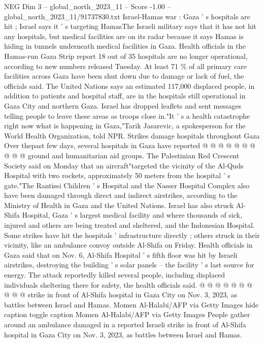 \begin{textsample}{NEG Dim 3 – global\_north\_2023\_11 – Score -1.00 – global\_north\_2023\_11/91737830.txt}  \label{ex:f3_neg_283}
Israel-Hamas war : Gaza ' s hospitals are hit ; Israel says it ' s targeting HamasThe Israeli military says that it has not hit any hospitals, but medical facilities are on its radar because it says Hamas is hiding in tunnels underneath medical facilities in Gaza.
Health officials in the Hamas-run Gaza Strip report 18 out of 35 hospitals are no longer operational, according to new numbers released Tuesday.
At least 71 \% of all primary care facilities across Gaza have been shut down due to damage or lack of fuel, the officials said.
The United Nations says an estimated 117,000 displaced people, in addition to patients and hospital staff, are in the hospitals still operational in Gaza City and northern Gaza.
Israel has dropped leaflets and sent messages telling people to leave these areas as troops close in."It ' s a health catastrophe right now what is happening in Gaza,"Tarik Jasarevic, a spokesperson for the World Health Organization, told NPR.
Strikes damage hospitals throughout Gaza Over thepast few days, several hospitals in Gaza have reported @ @ @ @ @ @ @ @ @ @ ground and humanitarian aid groups.
The Palestinian Red Crescent Society said on Monday that an aircraft"targeted the vicinity of the Al-Quds Hospital with two rockets, approximately 50 meters from the hospital ' s gate."The Rantissi Children ' s Hospital and the Nasser Hospital Complex also have been damaged through direct and indirect airstrikes, according to the Ministry of Health in Gaza and the United Nations.
Israel has also struck Al-Shifa Hospital, Gaza ' s largest medical facility and where thousands of sick, injured and others are being treated and sheltered, and the Indonesian Hospital.
Some strikes have hit the hospitals ' infrastructure directly ; others struck in their vicinity, like an ambulance convoy outside Al-Shifa on Friday.
Health officials in Gaza said that on Nov. 6, Al-Shifa Hospital ' s fifth floor was hit by Israeli airstrikes, destroying the building ' s solar panels -- the facility ' s last source for energy.
The attack reportedly killed several people, including displaced individuals sheltering there for safety, the health officials said. @ @ @ @ @ @ @ @ @ @ strike in front of Al-Shifa hospital in Gaza City on Nov. 3, 2023, as battles between Israel and Hamas.
Momen Al-Halabi/AFP via Getty Images hide caption toggle caption Momen Al-Halabi/AFP via Getty Images People gather around an ambulance damaged in a reported Israeli strike in front of Al-Shifa hospital in Gaza City on Nov. 3, 2023, as battles between Israel and Hamas.

\end{textsample}
